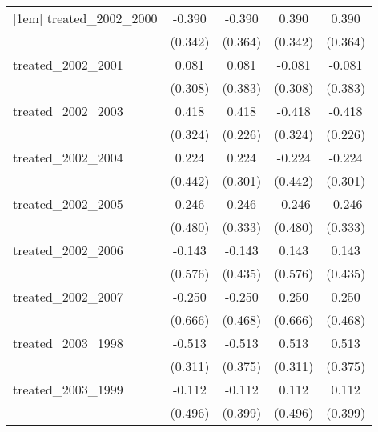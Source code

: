 {\begin{tabular}{l*{4}{c}}
[1em]
treated\_2002\_2000&      -0.390         &      -0.390         &       0.390         &       0.390         \\
            &     (0.342)         &     (0.364)         &     (0.342)         &     (0.364)         \\
[1em]
treated\_2002\_2001&       0.081         &       0.081         &      -0.081         &      -0.081         \\
            &     (0.308)         &     (0.383)         &     (0.308)         &     (0.383)         \\
[1em]
treated\_2002\_2003&       0.418         &       0.418         &      -0.418         &      -0.418         \\
            &     (0.324)         &     (0.226)         &     (0.324)         &     (0.226)         \\
[1em]
treated\_2002\_2004&       0.224         &       0.224         &      -0.224         &      -0.224         \\
            &     (0.442)         &     (0.301)         &     (0.442)         &     (0.301)         \\
[1em]
treated\_2002\_2005&       0.246         &       0.246         &      -0.246         &      -0.246         \\
            &     (0.480)         &     (0.333)         &     (0.480)         &     (0.333)         \\
[1em]
treated\_2002\_2006&      -0.143         &      -0.143         &       0.143         &       0.143         \\
            &     (0.576)         &     (0.435)         &     (0.576)         &     (0.435)         \\
[1em]
treated\_2002\_2007&      -0.250         &      -0.250         &       0.250         &       0.250         \\
            &     (0.666)         &     (0.468)         &     (0.666)         &     (0.468)         \\
[1em]
treated\_2003\_1998&      -0.513         &      -0.513         &       0.513         &       0.513         \\
            &     (0.311)         &     (0.375)         &     (0.311)         &     (0.375)         \\
[1em]
treated\_2003\_1999&      -0.112         &      -0.112         &       0.112         &       0.112         \\
            &     (0.496)         &     (0.399)         &     (0.496)         &     (0.399)         \\

\end{tabular}}
